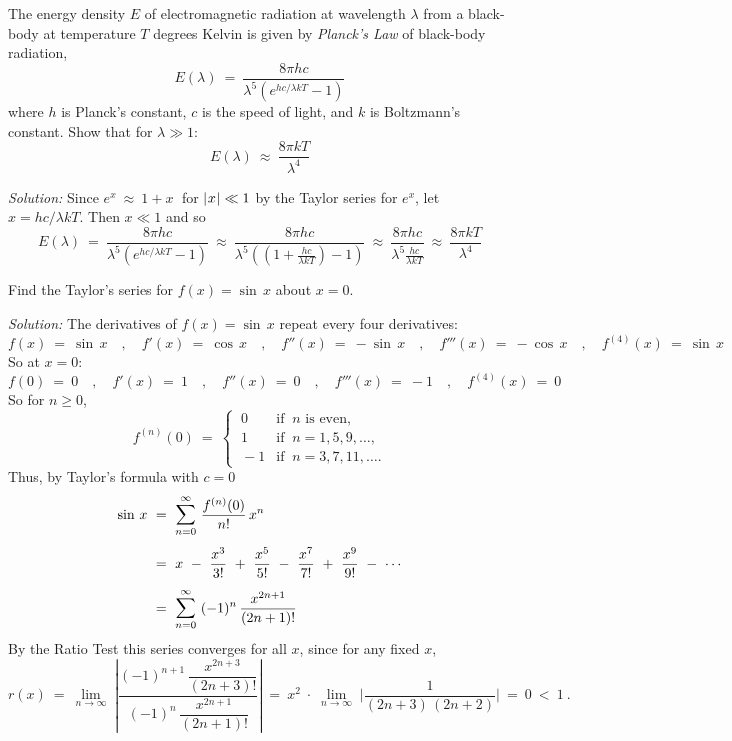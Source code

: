 \begin{exmp}\label{exmp:approxe}
\noindent The energy density $E$ of electromagnetic radiation at wavelength
$\lambda$ from a black-body at temperature $T$ degrees Kelvin is given by
\emph{Planck's Law} of black-body radiation,
\[
 E(\lambda) ~=~ \frac{8\pi h c}{\lambda^5 (e^{hc/\lambda kT} - 1)}
\]
where $h$ is Planck's constant, $c$ is the speed of light, and $k$ is Boltzmann's
constant. Show that for $\lambda \gg 1$:
\[
E(\lambda) ~\approx~ \frac{8\pi kT}{\lambda^4}
\]
\par\noindent\emph{Solution:} Since $e^x ~\approx~ 1 + x\;$ for $\lvert\mspace{1mu}x\mspace{1mu}\rvert \ll 1$
by the Taylor series for $e^x$, let $x = hc/\lambda kT$. Then $x \ll 1$ and so
\[
E(\lambda) ~=~ \frac{8\pi h c}{\lambda^5 (e^{hc/\lambda kT} - 1)} ~\approx~
 \frac{8\pi h c}{\lambda^5 \left(\left(1 + \frac{hc}{\lambda kT}\right) - 1\right)}
~\approx~  \frac{8\pi h c}{\lambda^5 \frac{hc}{\lambda kT}} ~\approx~
\frac{8\pi kT}{\lambda^4}
\]
\end{exmp}
\divider
\newpage
\begin{exmp}\label{exmp:taylorsin}
\noindent Find the Taylor's series for $f(x)=\sin\,x$ about $x=0$.\vspace{1mm}
\par\noindent\emph{Solution:} The derivatives of $f(x)=\sin\,x$ repeat every
four derivatives:
\[
f(x) ~=~ \sin\,x \quad,\quad
f'(x) ~=~ \cos\,x \quad,\quad
f''(x) ~=~ -\sin\,x \quad,\quad
f'''(x) ~=~ -\cos\,x \quad,\quad
f^{(4)}(x) ~=~ \sin\,x
\]
So at $x=0$:
\[
f(0) ~=~ 0 \quad,\quad
f'(x) ~=~ 1 \quad,\quad
f''(x) ~=~ 0 \quad,\quad
f'''(x) ~=~ -1 \quad,\quad
f^{(4)}(x) ~=~ 0
\]
So for $n\ge 0$,
\[
f^{(n)}(0) ~=~ \begin{cases} ~0 & \text{if $~n$ is even,}\\
~1 & \text{if $~n=1,5,9,\ldots$,}\\~-1 & \text{if $~n=3,7,11,\ldots$.}\end{cases}
\]
Thus, by Taylor's formula with $c=0$
\begin{align*}
\sin\,x ~&=~ \bigsum{n=0}{\infty}~ \frac{f^{(n)}(0)}{n !}\,x^n\\[4pt]
&=~ x ~-~ \frac{x^3}{3 !} ~+~ \frac{x^5}{5 !} ~-~ \frac{x^7}{7 !} ~+~
\frac{x^9}{9 !} ~-~ \cdots\\[4pt]
&=~ \bigsum{n=0}{\infty}~ (-1)^{n}\,\frac{x^{2n+1}}{(2n+1) !}
\end{align*}
By the Ratio Test this series converges for all $x$, since for any fixed $x$,
\[
r(x) ~=~ \lim_{n \to \infty} \;\left|\dfrac{(-1)^{n+1}\,\dfrac{x^{2n+3}}{(2n+3) !}}
{(-1)^{n}\,\dfrac{x^{2n+1}}{(2n+1) !}}\right| ~=~
x^2 \;\cdot\; \lim_{n \to \infty} \;\Biggl|\frac{1}{(2n+3)\,(2n+2)}\Biggr| ~=~ 0 ~<~ 1 ~.
\]
\end{exmp}
